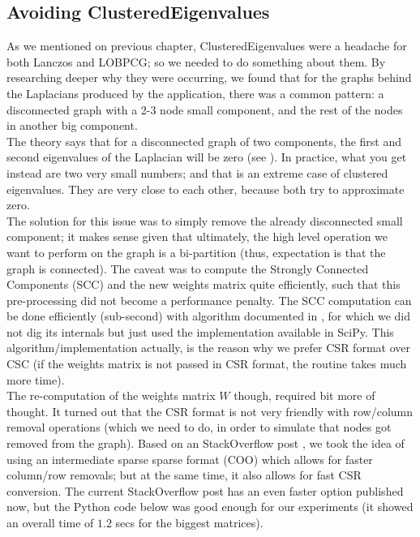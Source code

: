 \subsection{Avoiding \gls{ClusteredEigenvalues}}

As we mentioned on previous chapter, \gls{ClusteredEigenvalues} were a
headache for both Lanczos and LOBPCG; so we needed to do something
about them. By researching deeper why they were occurring, we found
that for the graphs behind the \gls{Laplacian}s produced by the
application, there was a common pattern: a disconnected graph with a
2-3 node small component, and the rest of the nodes in another big
component. \\

The theory says that for a disconnected graph of two components, the
first and second eigenvalues of the \gls{Laplacian} will be zero (see
\cite{luxburg07}). In practice, what you get instead are two very
small numbers; and that is an extreme case of clustered
eigenvalues. They are very close to each other, because both try to
approximate zero. \\

The solution for this issue was to simply remove the already
disconnected small component; it makes sense given that ultimately,
the high level operation we want to perform on the graph is a
bi-partition (thus, expectation is that the graph is connected). The
caveat was to compute the Strongly Connected Components (\gls{SCC}) and the
new weights matrix quite efficiently, such that this pre-processing
did not become a performance penalty. The \gls{SCC} computation can be done
efficiently (sub-second) with algorithm documented in \cite{pearce05},
for which we did not dig its internals but just used the
implementation available in SciPy. This  
algorithm/implementation actually, is the reason why we prefer CSR
format over CSC (if the weights matrix is not passed in CSR format,
the routine takes much more time). \\

The re-computation of the weights matrix $W$ though, required bit more
of thought. It turned out that the CSR format is not very friendly
with row/column removal operations (which we need to do, in order to
simulate that nodes got removed from the graph). Based on an
StackOverflow post \cite{alim15}, we took the idea of using an
intermediate sparse sparse format (COO) which allows for faster
column/row removals; but at the same time, it also allows for fast CSR
conversion. The current StackOverflow post has an even faster option
published now, but the Python code below was good enough for our
experiments (it showed an overall time of $1.2$ secs for the biggest
matrices). \\


